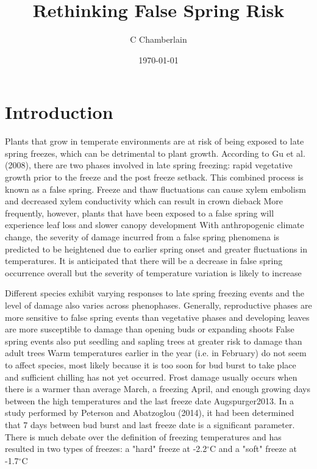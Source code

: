 \documentclass{article}\usepackage[]{graphicx}\usepackage[]{color}
\begin{document}
\title{Rethinking False Spring Risk}
\author{C Chamberlain}
\date{\today}
\maketitle 

\renewcommand{\thetable}{\arabic{table}}
\renewcommand{\thefigure}{\arabic{figure}}
\renewcommand{\labelitemi}{$-$}
\section*{Introduction}

Plants that grow in temperate environments are at risk of being exposed to late spring freezes, which can be detrimental to plant growth. According to Gu et al. (2008), there are two phases involved in late spring freezing: rapid vegetative growth prior to the freeze and the post freeze setback. This combined process is known as a false spring. Freeze and thaw fluctuations can cause xylem embolism and decreased xylem conductivity which can result in crown dieback %
More frequently, however, plants that have been exposed to a false spring will experience leaf loss and slower canopy development %
With anthropogenic climate change, the severity of damage incurred from a false spring phenomena is predicted to be heightened due to earlier spring onset and greater fluctuations in temperatures. It is anticipated that there will be a decrease in false spring occurrence overall but the severity of temperature variation is likely to increase %

Different species exhibit varying responses to late spring freezing events and the level of damage also varies across phenophases. Generally, reproductive phases are more sensitive to false spring events than vegetative phases and developing leaves are more susceptible to damage than opening buds or expanding shoots %
False spring events also put seedling and sapling trees at greater risk to damage than adult trees %
Warm temperatures earlier in the year (i.e. in February) do not seem to affect species, most likely because it is too soon for bud burst to take place and sufficient chilling has not yet occurred. Frost damage usually occurs when there is a warmer than average March, a freezing April, and enough growing days between the high temperatures and the last freeze date {Augspurger2013}. In a study performed by Peterson and Abatzoglou (2014), it had been determined that 7 days between bud burst and last freeze date is a significant parameter. There is much debate over the definition of freezing temperatures and has resulted in two types of freezes: a "hard" freeze at -2.2$^{\circ}$C and a "soft" freeze at -1.7$^{\circ}$C %
\end{document}
